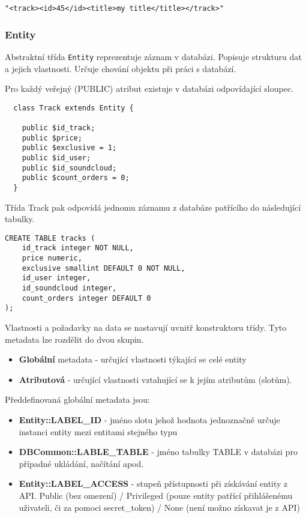\documentclass[12pt]{article}
\begin{document}
\begin{lstlisting}
"<track><id>45</id><title>my title</title></track>"
\end{lstlisting}

\subsubsection{Entity} \label{entity}
Abstraktní třída \verb|Entity| reprezentuje záznam v databázi. Popisuje strukturu dat a jejich vlastnosti. Určuje chování objektu při práci s databází.

Pro každý veřejný (PUBLIC) atribut existuje v databázi odpovídající sloupec.

\lstset{language=PHP}
\begin{lstlisting}
  class Track extends Entity {

    public $id_track;
    public $price;
    public $exclusive = 1;
    public $id_user;
    public $id_soundcloud;
    public $count_orders = 0;
  }
\end{lstlisting}

Třída Track pak odpovídá jednomu záznamu z databáze patřícího do  následující tabulky.

\lstset{language=SQL}
\begin{lstlisting}
CREATE TABLE tracks (
    id_track integer NOT NULL,
    price numeric,
    exclusive smallint DEFAULT 0 NOT NULL,
    id_user integer,
    id_soundcloud integer,
    count_orders integer DEFAULT 0
);
\end{lstlisting}

Vlastnosti a požadavky na data se nastavují uvnitř konstruktoru třídy. Tyto metadata lze rozdělit do dvou skupin.
\begin{itemize} 
\item \textbf{Globální} metadata - určující vlastnosti týkající se celé entity
\item \textbf{Atributová} - určující vlastnosti vztahující se k jejím atributům (slotům).
\end{itemize}

Předdefinovaná globální metadata jsou:

\begin{itemize}
\item \textbf{Entity::LABEL\_ID} - jméno slotu jehož hodnota jednoznačně určuje instanci entity mezi entitami stejného typu
\item \textbf{DBCommon::LABLE\_TABLE} - jméno tabulky TABLE v databázi pro případné ukládání, načítání apod.
\item \textbf{Entity::LABEL\_ACCESS} - stupeň přístupnosti při získávání entity z API. Public (bez omezení) / Privileged (pouze entity patřící přihlášenému uživateli, či za pomoci secret\_token) / None (není možno získavat je z API)
\end{itemize}
\end{document}
